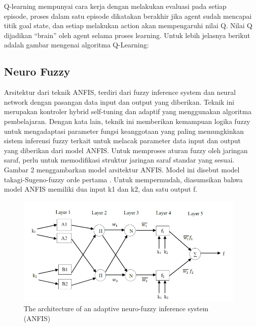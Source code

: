 Q-learning mempunyai cara kerja dengan melakukan evaluasi pada setiap episode, proses dalam satu episode dikatakan berakhir jika agent sudah mencapai titik goal state, dan setiap melakukan action akan mempengaruhi nilai Q. Nilai Q dijadikan “brain” oleh agent selama proses learning. Untuk lebih jelasnya berikut adalah gambar mengenai algoritma Q-Learning:

\subsection{Neuro Fuzzy}
Arsitektur dari teknik ANFIS, terdiri dari fuzzy inference system dan neural network dengan pasangan data input dan output yang diberikan. Teknik ini merupakan kontroler hybrid self-tuning dan adaptif yang menggunakan algoritma pembelajaran. Dengan kata lain, teknik ini memberikan kemampuan logika fuzzy untuk mengadaptasi parameter fungsi keanggotaan yang paling memungkinkan sistem inferensi fuzzy terkait untuk melacak parameter data input dan output yang diberikan dari model ANFIS. Untuk memproses aturan fuzzy oleh jaringan saraf, perlu untuk memodifikasi struktur jaringan saraf standar yang sesuai. Gambar 2 menggambarkan model arsitektur ANFIS. Model ini disebut model takagi-Sugeno-fuzzy orde pertama . Untuk mempermudah, diasumsikan bahwa model ANFIS memiliki dua input k1 dan k2, dan satu output f.

\begin{figure}[H]
	\centering
	\includegraphics[width=0.7\linewidth]{figure/screenshot009}
	\caption[]{The architecture of an adaptive neuro-fuzzy inference system (ANFIS)}
	\label{fig:screenshot009}
\end{figure}

